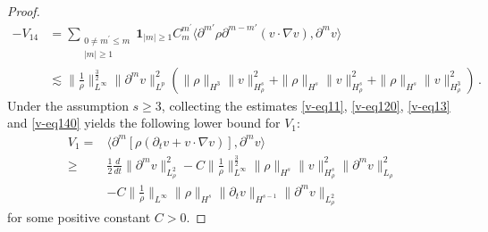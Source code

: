 \documentclass[reqno,11pt]{amsart}
\numberwithin{equation}{section}
\begin{document}
\begin{proof}
\begin{equation}\label{v-eq140}
	\begin{aligned}
 -V_{14}& = \sum_{\substack{0\neq m^{\prime}\leq m \\ |m|\geq 1}} \mathbf{1}_{|m|\geq 1}C_m^{m^{\prime}} \langle \partial^{m'} \rho\partial^{m - m'} (v \cdot \nabla v), \partial^m v \rangle \\&
\lesssim \|\frac{1}{\rho}\|_{L^\infty}^{\frac{3}{2}} \| \partial^m v \|_{L^p}^2 \left( \| \rho\|_{H^{3}} \| v \|^2_{H^s_\rho} + \| \rho\|_{H^s} \| v \|_{H^s_\rho}^2 + \| \rho\|_{H^s} \| v \|_{H^3_\rho}^2 \right) \,.
	\end{aligned}
\end{equation}
Under the assumption $s \geq 3$, collecting the estimates \eqref{v-eq11}, \eqref{v-eq120}, \eqref{v-eq13} and \eqref{v-eq140} yields the following lower bound for $V_1$:
\begin{equation}\label{v1-eq}
	\begin{aligned}
V_1 = & \langle \partial^m \left[ \rho \left( \partial_t v + v \cdot \nabla v \right) \right], \partial^m v \rangle \\
\geq & \frac{1}{2} \frac{d}{dt} \| \partial^m v \|_{L^2_\rho}^2 - C\| \frac{1}{\rho} \|_{L^\infty}^{\frac{3}{2}} \| \rho \|_{H^s} \| v \|^2_{H^s_\rho}\| \partial^m v \|_{L_\rho}^2 \\
& - C \| \frac{1}{\rho} \|_{L^\infty} \| \rho \|_{H^s} \| \partial_t v \|_{H^{s-1}} \| \partial^m v \|_{L^2_\rho}
	\end{aligned}
\end{equation}
for some positive constant $C>0$.


\end{proof}
\end{document}
